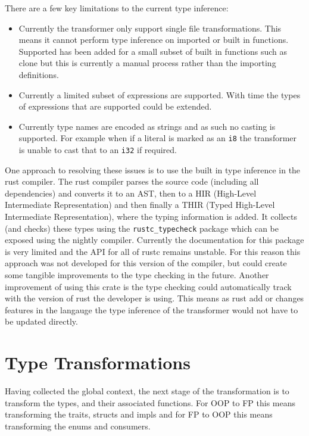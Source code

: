 \documentclass[ oneside,%
                    author={James Elgar},
                    degree={MEng},
                     title={Bidirectional transformer between functional and \\ object-oriented programming in Rust},
                  subtitle={}]{dissertation}
\newcommand{\rust}[1]{\texttt{#1}}
\begin{document}
There are a few key limitations to the current type inference:

\begin{itemize}
    \item  Currently the transformer only support single file transformations. This means it cannot perform type inference on imported or built in functions. Supported has been added for a small subset of built in functions such as clone but this is currently a manual process rather than the importing definitions.
    \item  Currently a limited subset of expressions are supported. With time the types of expressions that are supported could be extended.
    \item Currently type names are encoded as strings and as such no casting is supported. For example when if a literal is marked as an \rust{i8} the transformer is unable to cast that to an \rust{i32} if required.
\end{itemize}

One approach to resolving these issues is to use the built in type inference in the rust compiler. The rust compiler parses the source code (including all dependencies) and converts it to an AST, then to a HIR (High-Level Intermediate Representation) and then finally a THIR (Typed High-Level Intermediate Representation), where the typing information is added. It collects (and checks) these types using the \verb|rustc_typecheck| package which can be exposed using the nightly compiler. Currently the documentation for this package is very limited and the API for all of rustc remains unstable. For this reason this approach was not developed for this version of the compiler, but could create some tangible improvements to the type checking in the future. Another improvement of using this crate is the type checking could automatically track with the version of rust the developer is using. This means as rust add or changes features in the langauge the type inference of the transformer would not have to be updated directly.

\section{Type Transformations}

Having collected the global context, the next stage of the transformation is to transform the types, and their associated functions. For OOP to FP this means transforming the traits, structs and impls and for FP to OOP this means transforming the enums and consumers.
\end{document}
